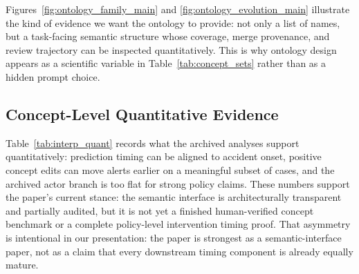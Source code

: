 Figures~\ref{fig:ontology_family_main} and
\ref{fig:ontology_evolution_main} illustrate the kind of evidence we want the
ontology to provide: not only a list of names, but a task-facing semantic
structure whose coverage, merge provenance, and review trajectory can be
inspected quantitatively. This is why ontology design appears as a scientific
variable in Table~\ref{tab:concept_sets} rather than as a hidden prompt choice.

\subsection{Concept-Level Quantitative Evidence}

\begin{table}[t]
\caption{[Mechanism stress evidence] Quantitative semantic-interface
diagnostics from archived DAD
analyses. These diagnostics complement the case studies by quantifying timing
alignment, edit sensitivity, and actor behavior in the archived DAD assets.}
\label{tab:interp_quant}
\centering\footnotesize
\TableStyleOn
\setlength{\tabcolsep}{2.5pt}
\TableStyleOff
\end{table}

Table~\ref{tab:interp_quant} records what the archived analyses support
quantitatively: prediction timing can be aligned
to accident onset, positive concept edits can move alerts earlier on a
meaningful subset of cases, and the archived actor branch is too flat for
strong policy claims. These numbers support the paper's current stance: the
semantic interface is architecturally transparent and partially audited, but it
is not yet a finished human-verified concept benchmark or a complete
policy-level intervention
timing proof. That asymmetry is intentional in our presentation: the paper is
strongest as a semantic-interface paper, not as a claim that every downstream
timing component is already equally mature.

